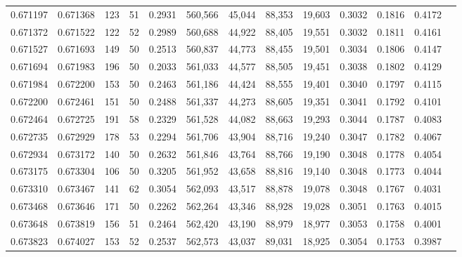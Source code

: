 \begin{tabular}{rrrrrrrrrrrrr}
0.671197 & 0.671368 &   123 &  51 &                                     0.2931 & 560,566 &  45,044 &  88,353 &  19,603 & 0.3032 & 0.1816 & 0.4172 \\
0.671372 & 0.671522 &   122 &  52 &                                     0.2989 & 560,688 &  44,922 &  88,405 &  19,551 & 0.3032 & 0.1811 & 0.4161 \\
0.671527 & 0.671693 &   149 &  50 &                                     0.2513 & 560,837 &  44,773 &  88,455 &  19,501 & 0.3034 & 0.1806 & 0.4147 \\
0.671694 & 0.671983 &   196 &  50 &                                     0.2033 & 561,033 &  44,577 &  88,505 &  19,451 & 0.3038 & 0.1802 & 0.4129 \\
0.671984 & 0.672200 &   153 &  50 &                                     0.2463 & 561,186 &  44,424 &  88,555 &  19,401 & 0.3040 & 0.1797 & 0.4115 \\
0.672200 & 0.672461 &   151 &  50 &                                     0.2488 & 561,337 &  44,273 &  88,605 &  19,351 & 0.3041 & 0.1792 & 0.4101 \\
0.672464 & 0.672725 &   191 &  58 &                                     0.2329 & 561,528 &  44,082 &  88,663 &  19,293 & 0.3044 & 0.1787 & 0.4083 \\
0.672735 & 0.672929 &   178 &  53 &                                     0.2294 & 561,706 &  43,904 &  88,716 &  19,240 & 0.3047 & 0.1782 & 0.4067 \\
0.672934 & 0.673172 &   140 &  50 &                                     0.2632 & 561,846 &  43,764 &  88,766 &  19,190 & 0.3048 & 0.1778 & 0.4054 \\
0.673175 & 0.673304 &   106 &  50 &                                     0.3205 & 561,952 &  43,658 &  88,816 &  19,140 & 0.3048 & 0.1773 & 0.4044 \\
0.673310 & 0.673467 &   141 &  62 &                                     0.3054 & 562,093 &  43,517 &  88,878 &  19,078 & 0.3048 & 0.1767 & 0.4031 \\
0.673468 & 0.673646 &   171 &  50 &                                     0.2262 & 562,264 &  43,346 &  88,928 &  19,028 & 0.3051 & 0.1763 & 0.4015 \\
0.673648 & 0.673819 &   156 &  51 &                                     0.2464 & 562,420 &  43,190 &  88,979 &  18,977 & 0.3053 & 0.1758 & 0.4001 \\
0.673823 & 0.674027 &   153 &  52 &                                     0.2537 & 562,573 &  43,037 &  89,031 &  18,925 & 0.3054 & 0.1753 & 0.3987 \\

\end{tabular}
